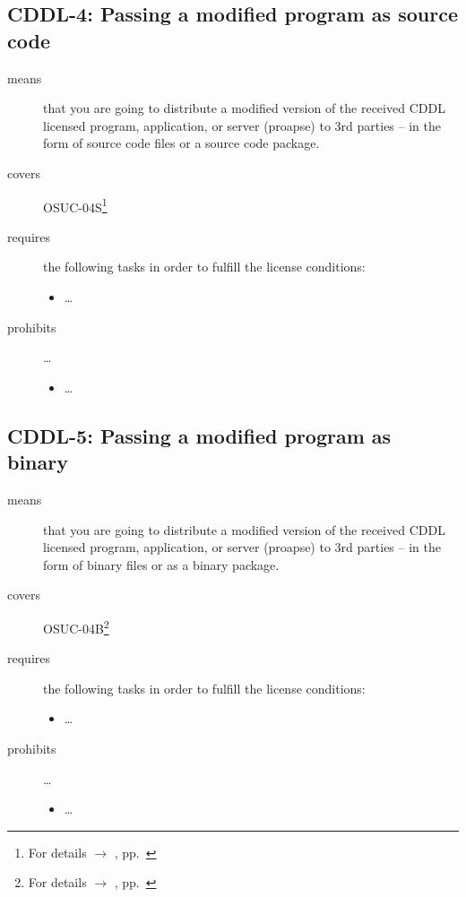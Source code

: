 \subsection{CDDL-4: Passing a modified program as source code}
\label{OSUC-04S-CDDL} 

\begin{description}
\item[means] that you are going to distribute a modified version of the received
CDDL licensed program, application, or server (proapse) to 3rd parties -- in the
form of source code files or a source code package.
\item[covers] OSUC-04S\footnote{For details $\rightarrow$ \oslic, pp.\
\pageref{OSUC-04S-DEF}}
\item[requires] the following tasks in order to fulfill the license conditions:
\begin{itemize}
  
  \item \ldots
  
\end{itemize}

\item[prohibits] \ldots
\begin{itemize}
  \item \ldots
\end{itemize}
\end{description}

\subsection{CDDL-5: Passing a modified program as binary}
\label{OSUC-04B-CDDL} 

\begin{description}
\item[means] that you are going to distribute a modified version of the received
CDDL licensed pro\-gram, application, or server (proapse) to 3rd parties -- in
the form of binary files or as a binary package.
\item[covers] OSUC-04B\footnote{For details $\rightarrow$ \oslic, pp.\
\pageref{OSUC-04B-DEF}}
\item[requires] the following tasks in order to fulfill the license conditions:
\begin{itemize}
  
  \item \ldots
  
\end{itemize}

\item[prohibits] \ldots
\begin{itemize}
  \item \ldots
\end{itemize}
\end{description}

